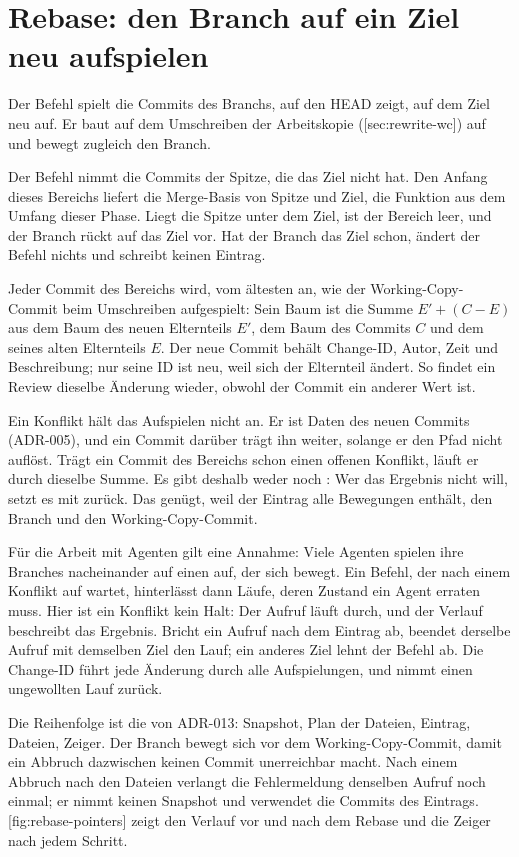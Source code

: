 \section[sec:rebase]{Rebase: den Branch auf ein Ziel neu aufspielen}
Der Befehl  spielt die Commits des Branchs, auf den HEAD zeigt,
auf dem Ziel neu auf.
Er baut auf dem Umschreiben der Arbeitskopie ([sec:rewrite-wc]) auf und bewegt
zugleich den Branch.

Der Befehl nimmt die Commits der Spitze, die das Ziel nicht hat.
Den Anfang dieses Bereichs liefert die Merge-Basis von Spitze und Ziel,
die Funktion  aus dem Umfang dieser Phase.
Liegt die Spitze unter dem Ziel, ist der Bereich leer, und der Branch rückt auf das Ziel vor.
Hat der Branch das Ziel schon, ändert der Befehl nichts und schreibt keinen Eintrag.

Jeder Commit des Bereichs wird, vom ältesten an, wie der Working-Copy-Commit beim Umschreiben
aufgespielt:
Sein Baum ist die Summe $E' + (C - E)$ aus dem Baum des neuen Elternteils $E'$,
dem Baum des Commits $C$ und dem seines alten Elternteils $E$.
Der neue Commit behält Change-ID, Autor, Zeit und Beschreibung;
nur seine ID ist neu, weil sich der Elternteil ändert.
So findet ein Review dieselbe Änderung wieder, obwohl der Commit ein anderer Wert ist.

Ein Konflikt hält das Aufspielen nicht an.
Er ist Daten des neuen Commits (ADR-005), und ein Commit darüber trägt ihn weiter,
solange er den Pfad nicht auflöst.
Trägt ein Commit des Bereichs schon einen offenen Konflikt, läuft er durch dieselbe Summe.
Es gibt deshalb weder  noch :
Wer das Ergebnis nicht will, setzt es mit  zurück.
Das genügt, weil der Eintrag alle Bewegungen enthält, den Branch und den Working-Copy-Commit.

Für die Arbeit mit Agenten gilt eine Annahme: Viele Agenten spielen ihre Branches nacheinander
auf einen  auf, der sich bewegt.
Ein Befehl, der nach einem Konflikt auf  wartet, hinterlässt dann Läufe,
deren Zustand ein Agent erraten muss.
Hier ist ein Konflikt kein Halt: Der Aufruf läuft durch, und der Verlauf beschreibt das Ergebnis.
Bricht ein Aufruf nach dem Eintrag ab, beendet derselbe Aufruf mit demselben Ziel den Lauf;
ein anderes Ziel lehnt der Befehl ab.
Die Change-ID führt jede Änderung durch alle Aufspielungen,
und  nimmt einen ungewollten Lauf zurück.

Die Reihenfolge ist die von ADR-013: Snapshot, Plan der Dateien, Eintrag, Dateien, Zeiger.
Der Branch bewegt sich vor dem Working-Copy-Commit, damit ein Abbruch dazwischen
keinen Commit unerreichbar macht.
Nach einem Abbruch nach den Dateien verlangt die Fehlermeldung denselben Aufruf noch einmal;
er nimmt keinen Snapshot und verwendet die Commits des Eintrags.
[fig:rebase-pointers] zeigt den Verlauf vor und nach dem Rebase
und die Zeiger nach jedem Schritt.

